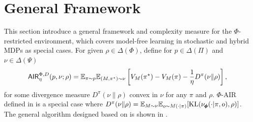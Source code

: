 \section{General Framework}\label{sec: general framework}
This section introduce a general framework and complexity measure for the $\Phi$-restricted environment, which covers model-free learning in stochastic and hybrid MDPs as special cases. For given $\rho\in\Delta(\Phi)$, define for $p\in\Delta(\Pi)$ and $\nu\in\Delta(\Psi)$ %
\begin{align}
    \mathsf{AIR}^{\Phi, D}_{\eta}(p,\nu; \rho) = \mathbb{E}_{\pi \sim p}\mathbb{E}_{(M,\pi^\star) \sim \nu}\left[V_{M}(\pi^\star) -V_{M}(\pi) - \frac{1}{\eta} D^\pi(\nu\|\rho)\right],  \label{eq: new AIR} 
\end{align}
for some divergence measure $D^\pi(\nu\|\rho)$ convex in $\nu$ for any $\pi $ and $\rho$. $\Phi$-AIR defined in  is a special case where $D^\pi(\nu\|\rho) = \mathbb{E}_{M\sim \nu}\mathbb{E}_{o\sim M(\cdot|\pi)}[\text{KL}(\nu_{\pmb{\phi}}(\cdot|\pi,o), \rho)]$. The general algorithm designed based on  is shown in . 




